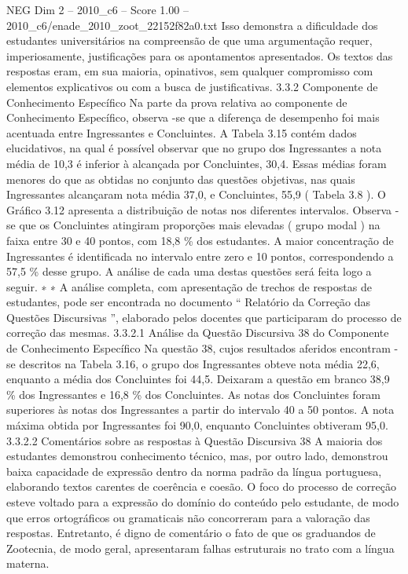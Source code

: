 \begin{textsample}{NEG Dim 2 – 2010\_c6 – Score 1.00 – 2010\_c6/enade\_2010\_zoot\_22152f82a0.txt}
Isso demonstra a dificuldade dos estudantes universitários na compreensão de que uma argumentação requer, imperiosamente, justificações para os apontamentos apresentados.
Os textos das respostas eram, em sua maioria, opinativos, sem qualquer compromisso com elementos explicativos ou com a busca de justificativas. 3.3.2 Componente de Conhecimento Específico Na parte da prova relativa ao componente de Conhecimento Específico, observa -se que a diferença de desempenho foi mais acentuada entre Ingressantes e Concluintes.
A Tabela 3.15 contém dados elucidativos, na qual é possível observar que no grupo dos Ingressantes a nota média de 10,3 é inferior à alcançada por Concluintes, 30,4.
Essas médias foram menores do que as obtidas no conjunto das questões objetivas, nas quais Ingressantes alcançaram nota média 37,0, e Concluintes, 55,9 ( Tabela 3.8 ).
O Gráfico 3.12 apresenta a distribuição de notas nos diferentes intervalos.
Observa -se que os Concluintes atingiram proporções mais elevadas ( grupo modal ) na faixa entre 30 e 40 pontos, com 18,8 \% dos estudantes.
A maior concentração de Ingressantes é identificada no intervalo entre zero e 10 pontos, correspondendo a 57,5 \% desse grupo.
A análise de cada uma destas questões será feita logo a seguir. ∗ ∗ A análise completa, com apresentação de trechos de respostas de estudantes, pode ser encontrada no documento “ Relatório da Correção das Questões Discursivas ”, elaborado pelos docentes que participaram do processo de correção das mesmas. 3.3.2.1 Análise da Questão Discursiva 38 do Componente de Conhecimento Específico Na questão 38, cujos resultados aferidos encontram -se descritos na Tabela 3.16, o grupo dos Ingressantes obteve nota média 22,6, enquanto a média dos Concluintes foi 44,5.
Deixaram a questão em branco 38,9 \% dos Ingressantes e 16,8 \% dos Concluintes.
As notas dos Concluintes foram superiores às notas dos Ingressantes a partir do intervalo 40 a 50 pontos.
A nota máxima obtida por Ingressantes foi 90,0, enquanto Concluintes obtiveram 95,0. 3.3.2.2 Comentários sobre as respostas à Questão Discursiva 38 A maioria dos estudantes demonstrou conhecimento técnico, mas, por outro lado, demonstrou baixa capacidade de expressão dentro da norma padrão da língua portuguesa, elaborando textos carentes de coerência e coesão.
O foco do processo de correção esteve voltado para a expressão do domínio do conteúdo pelo estudante, de modo que erros ortográficos ou gramaticais não concorreram para a valoração das respostas.
Entretanto, é digno de comentário o fato de que os graduandos de Zootecnia, de modo geral, apresentaram falhas estruturais no trato com a língua materna.

\end{textsample}
